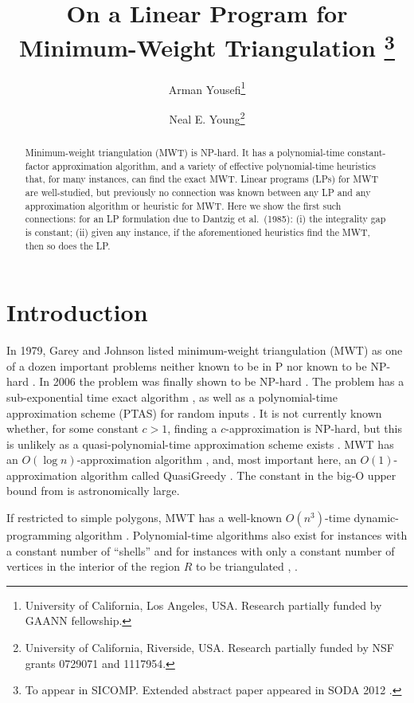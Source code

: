 \documentclass[final]{siamltex}
\title{On a Linear Program for Minimum-Weight Triangulation
\thanks{To appear in SICOMP. Extended abstract paper appeared in SODA 2012 \cite{yousefi2012linear,yousefi2013linear}.}}
\author{Arman Yousefi\thanks{University of California, Los Angeles, USA.
    Research partially funded by GAANN fellowship.
}
\and
Neal E. Young\thanks{University of California, Riverside, USA.
  Research partially funded by NSF grants 0729071 and 1117954.
}
}
\newcommand{\region}{R}
\begin{document}
\maketitle

\begin{abstract}
Minimum-weight triangulation (MWT) is NP-hard.
It has a polynomial-time constant-factor approximation algorithm,
and a variety of effective polynomial-time heuristics that, for many instances, can find the exact MWT.
Linear programs (LPs) for MWT are well-studied,
but previously no connection was known between any LP
and any approximation algorithm or heuristic for MWT.
Here we show the first such connections:
for an LP formulation due to Dantzig et al.~(1985):
(i) the integrality gap is constant;
(ii) given any instance, if the aforementioned heuristics find the MWT, then so does the LP.
\end{abstract}




\section{Introduction}

In 1979, Garey and Johnson listed minimum-weight triangulation (MWT) 
as one of a dozen important problems neither known to be in P 
nor known to be NP-hard \cite{garey1979computers}.
In 2006 the problem was finally shown to be NP-hard \cite{mulzer2008minimum}.
The problem has a sub-exponential time exact algorithm \cite{smith1988studies},
as well as a polynomial-time approximation scheme (PTAS) 
for random inputs \cite{golin1996limit}.
It is not currently known whether, for some constant $c>1$,
finding a $c$-approximation is NP-hard,
but this is unlikely as a quasi-polynomial-time approximation scheme exists \cite{remy2009quasi}.
MWT has an $O(\log n)$-approximation algorithm \cite{plaisted1987heuristic},
and, most important here,
an $O(1)$-approximation algorithm
called {\sc QuasiGreedy} \cite{krznaric1998quasi}.
The constant in the big-O upper bound from \cite{krznaric1998quasi}
is astronomically large.

If restricted to simple polygons, MWT
has a well-known $O(n^3)$-time dynamic-programming algorithm 
\cite{gilbert1979new,klincsek1980minimal}.
Polynomial-time algorithms also exist for instances with a constant number of ``shells''
\cite{anagnostou1993polynomial}
and for instances with only a constant number of vertices in the interior of the 
region $\region$ to be triangulated
\cite[\S 2.5.1]{Giannopoulos:2007cx},
\cite{hoffmann2006minimum,borgelt2008fixed,spillner5faster,knauer2006fixed}.
\end{document}
